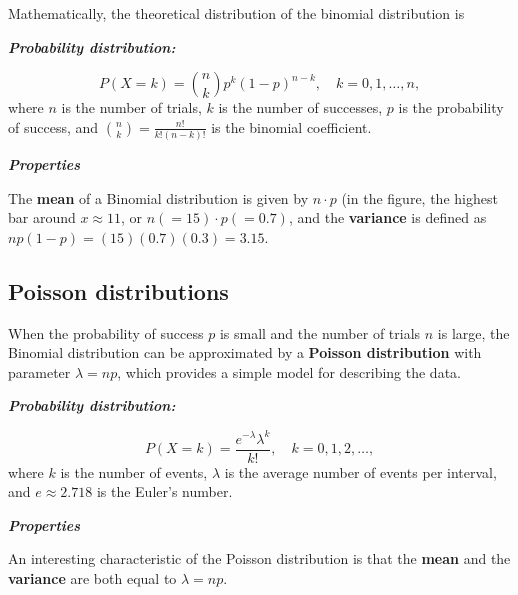 \documentclass[
  letterpaper,
  DIV=11,
  numbers=noendperiod]{scrreprt}
\begin{document}
Mathematically, the theoretical distribution of the binomial
distribution is

\textbf{\emph{Probability distribution:}}

\[P(X = k) = \binom{n}{k} p^k (1-p)^{n-k}, \quad k = 0, 1, \ldots, n,\]
where \(n\) is the number of trials, \(k\) is the number of successes,
\(p\) is the probability of success, and
\(\binom{n}{k} = \frac{n!}{k!(n-k)!}\) is the binomial coefficient.

\textbf{\emph{Properties}}

The \textbf{mean} of a Binomial distribution is given by \(n \cdot p\)
(in the figure, the highest bar around \(x \approx 11\), or
\(n(=15)\cdot p(=0.7)\), and the \textbf{variance} is defined as
\(np(1-p) = (15)(0.7)(0.3) = 3.15\).

\subsection{Poisson distributions}\label{poisson-distributions}

When the probability of success \(p\) is small and the number of trials
\(n\) is large, the Binomial distribution can be approximated by a
\textbf{Poisson distribution} with parameter \(\lambda = np\), which
provides a simple model for describing the data.

\textbf{\emph{Probability distribution:}}

\[P(X = k) = \frac{e^{-\lambda} \lambda^k}{k!}, \quad k = 0, 1, 2, \ldots,\]
where \(k\) is the number of events, \(\lambda\) is the average number
of events per interval, and \(e\approx 2.718\) is the Euler's number.

\textbf{\emph{Properties}}

An interesting characteristic of the Poisson distribution is that the
\textbf{mean} and the \textbf{variance} are both equal to
\(\lambda = np\).
\end{document}
